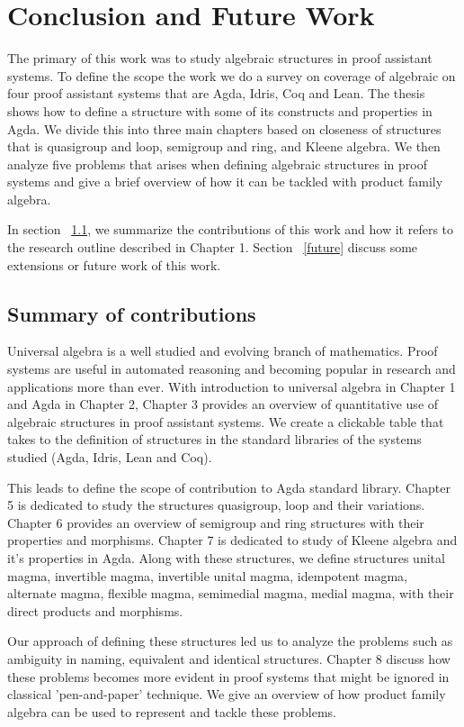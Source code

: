 \chapter{Conclusion and Future Work}
The primary of this work was to study algebraic structures in proof assistant
systems. To define the scope the work we do a survey on coverage of algebraic on
four proof assistant systems that are Agda, Idris, Coq and Lean. The thesis
shows how to define a structure with some of its constructs and properties in
Agda. We divide this into three main chapters based on closeness of structures
that is quasigroup and loop, semigroup and ring, and Kleene algebra. We then
analyze five problems that arises when defining algebraic structures in proof
systems and give a brief overview of how it can be tackled with product family
algebra.

In section ~\ref{contribution}, we summarize the contributions of this work and
how it refers to the research outline described in Chapter 1. Section
~\ref{future} discuss some extensions or future work of this work. 

\section{Summary of contributions}
\label{contribution}
Universal algebra is a well studied and evolving branch of mathematics. Proof
systems are useful in automated reasoning and becoming popular in research and
applications more than ever. With introduction to universal algebra in Chapter 1
and Agda in Chapter 2, Chapter 3 provides an overview of quantitative use of
algebraic structures in proof assistant systems. We create a clickable table
that takes to the definition of structures in the standard libraries of the
systems studied (Agda, Idris, Lean and Coq).

This leads to define the scope of contribution to Agda standard library. Chapter
5 is dedicated to study the structures quasigroup, loop and their variations.
Chapter 6 provides an overview of semigroup and ring structures with their
properties and morphisms. Chapter 7 is dedicated to study of Kleene algebra and
it's properties in Agda. Along with these structures, we define structures
unital magma, invertible magma, invertible unital magma, idempotent magma,
alternate magma, flexible magma, semimedial magma, medial magma, with their
direct products and morphisms.

Our approach of defining these structures led us to analyze the problems such as
ambiguity in naming, equivalent and identical structures. Chapter 8 discuss how
these problems becomes more evident in proof systems that might be ignored in
classical 'pen-and-paper' technique. We give an overview of how product family
algebra can be used to represent and tackle these problems.

